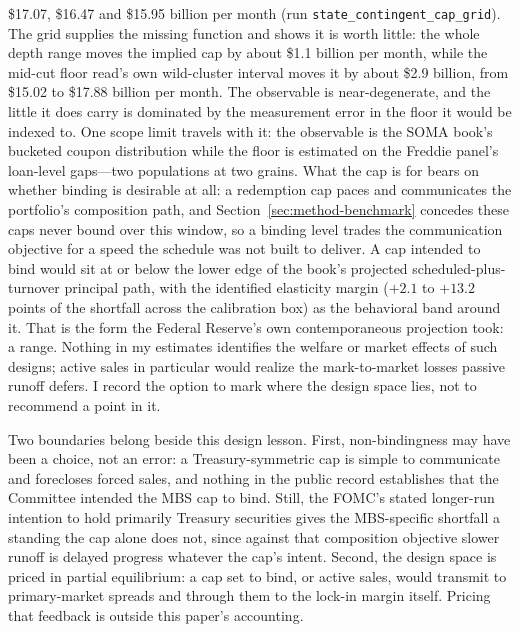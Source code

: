 \documentclass[12pt]{article}
\begin{document}
\$17.07, \$16.47 and \$15.95 billion per month (run \texttt{state\_contingent\_cap\_grid}). The grid supplies the missing function and shows it is worth little: the whole depth range moves the implied cap by about \$1.1 billion per month, while the mid-cut floor read's own wild-cluster interval moves it by about \$2.9 billion, from \$15.02 to \$17.88 billion per month. The observable is near-degenerate, and the little it does carry is dominated by the measurement error in the floor it would be indexed to. One scope limit travels with it: the observable is the SOMA book's bucketed coupon distribution while the floor is estimated on the Freddie panel's loan-level gaps---two populations at two grains. What the cap is for bears on whether binding is desirable at all: a redemption cap paces and communicates the portfolio's composition path, and Section~\ref{sec:method-benchmark} concedes these caps never bound over this window, so a binding level trades the communication objective for a speed the schedule was not built to deliver. A cap intended to bind would sit at or below the lower edge of the book's projected scheduled-plus-turnover principal path, with the identified elasticity margin ($+2.1$ to $+13.2$ points of the shortfall across the calibration box) as the behavioral band around it. That is the form the Federal Reserve's own contemporaneous projection took: a range. Nothing in my estimates identifies the welfare or market effects of such designs; active sales in particular would realize the mark-to-market losses passive runoff defers. I record the option to mark where the design space lies, not to recommend a point in it.

Two boundaries belong beside this design lesson. First, non-bindingness may have been a choice, not an error: a Treasury-symmetric cap is simple to communicate and forecloses forced sales, and nothing in the public record establishes that the Committee intended the MBS cap to bind. Still, the FOMC's stated longer-run intention to hold primarily Treasury securities gives the MBS-specific shortfall a standing the cap alone does not, since against that composition objective slower runoff is delayed progress whatever the cap's intent. Second, the design space is priced in partial equilibrium: a cap set to bind, or active sales, would transmit to primary-market spreads and through them to the lock-in margin itself. Pricing that feedback is outside this paper's accounting.
\end{document}
